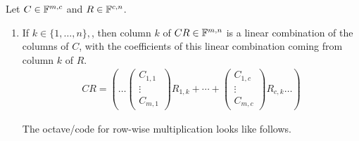 \begin{thm}
  \phantom{.}
  
  Let $C\in\mathbb{F}^{m,c}$ and $R\in\mathbb{F}^{c,n}$.
  \begin{enumerate}
    \item If $k \in \{1,\ldots,n\},$, then column $k$ of $CR\in \mathbb{F}^{m,n}$ is a linear combination of the columns of $C$, with the coefficients of this linear combination coming from column $k$ of $R$.
    \begin{equation}
      \begin{aligned}
        CR = 
          \left ( \ldots \left(
            \begin{matrix}C_{1,1} 
              \\ \vdots \\ C_{m,1} 
            \end{matrix}
          \right) R_{1,k} 
          + \cdots + 
          \left(
            \begin{matrix}C_{1,c}
              \\ \vdots \\ C_{m,c} 
            \end{matrix}\right) R_{c,k}
          \ldots
        \right)
      \end{aligned}
    \end{equation}
    
  The octave\-/code for row-wise multiplication looks like follows.
  
  \begin{center}    
    \begin{minipage}{\linewidth}
      \addtolength{\linewidth}{-7em}  
      
      \addtolength{\linewidth}{+7em}
    \end{minipage}
  \end{center}
  

\end{enumerate}
\end{thm}
